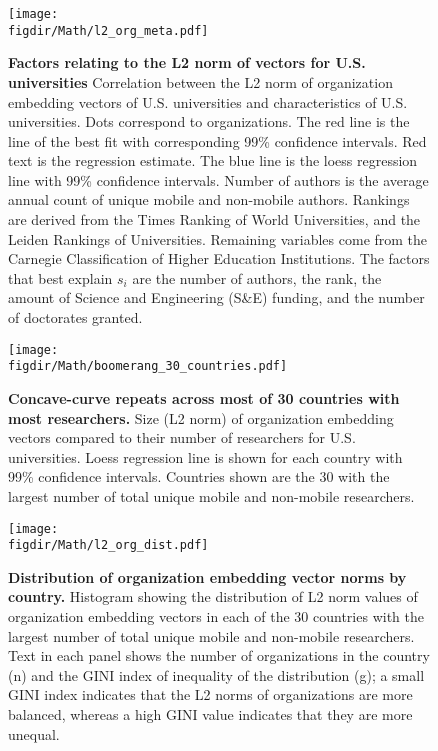 \documentclass[12pt]{article} %
\def\figdir{../Figs}
\begin{document}
%
%
\begin{figure}[hp!]
	\centering
	\texttt{[image: \\figdir/Math/l2\_org\_meta.pdf]}
	\caption{
		\textbf{Factors relating to the L2 norm of vectors for U.S. universities}
		Correlation between the L2 norm of organization embedding vectors of U.S. universities and characteristics of U.S. universities.
		Dots correspond to organizations.
		The red line is the line of  the best fit with corresponding 99\% confidence intervals.
		Red text is the regression estimate.
		The blue line is the loess regression line with 99\% confidence intervals.
		Number of authors is the average annual count of unique mobile and non-mobile authors.
		Rankings are derived from the Times Ranking of World Universities, and the Leiden Rankings of Universities.
		Remaining variables come from the Carnegie Classification of Higher Education Institutions.
		The factors that best explain $s_i$ are the number of authors, the rank, the amount of Science and Engineering (S\&E) funding, and the number of doctorates granted.
	}
	\label{fig:supp:length_vs_metaInfo}
\end{figure}



%
%
\begin{figure}[h!]
	\centering
	\texttt{[image: \\figdir/Math/boomerang\_30\_countries.pdf]}
	\caption{
		\textbf{Concave-curve repeats across most of 30 countries with most researchers.}
		Size (L2 norm) of organization embedding vectors compared to their number of researchers for U.S. universities.
		Loess regression line is shown for each country with 99\% confidence intervals.
		Countries shown are the 30 with the largest number of total unique mobile and non-mobile researchers.
	}
	\label{fig:concave30}
\end{figure}



%
%
\begin{figure}[h!]
	\centering
	\texttt{[image: \\figdir/Math/l2\_org\_dist.pdf]}
	\caption{
		\textbf{Distribution of organization embedding vector norms by country.}
		Histogram showing the distribution of L2 norm values of organization embedding vectors in each of the 30 countries with the largest number of total unique mobile and non-mobile researchers.
		Text in each panel shows the number of organizations in the country (n) and the GINI index of inequality of the distribution (g);
		a small GINI index indicates that the L2 norms of organizations are more balanced, whereas a high GINI value indicates that they are more unequal.
	}
	\label{fig:norm_dist}
\end{figure}






\clearpage
\printbibliography{}
\end{document}
